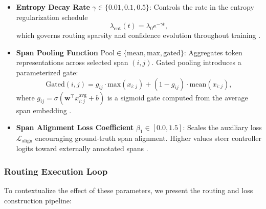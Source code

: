 \begin{itemize}[leftmargin=1.5em]
  \item \textbf{Entropy Decay Rate} \(\gamma \in \{0.01, 0.1, 0.5\}\): Controls the rate in the entropy regularization schedule
  \begin{equation}
  \lambda_{\mathrm{ent}}(t) = \lambda_0 e^{-\gamma t},
  \label{eq:entropy_schedule}
  \end{equation}
  which governs routing sparsity and confidence evolution throughout training \cite{grandvalet2006entropy, pereyra2017regularizing}.

  \item \textbf{Span Pooling Function} \(\mathrm{Pool} \in \{\mathrm{mean}, \mathrm{max}, \mathrm{gated}\}\): Aggregates token representations across selected span \((i, j)\). Gated pooling introduces a parameterized gate:
  \begin{equation}
  \text{Gated}(i, j) = g_{ij} \cdot \mathrm{max}(x_{i:j}) + (1 - g_{ij}) \cdot \mathrm{mean}(x_{i:j}),
  \label{eq:gated_pooling}
  \end{equation}
  where \(g_{ij} = \sigma(\mathbf{w}^\top x_{i:j}^{\text{avg}} + b)\) is a sigmoid gate computed from the average span embedding \cite{kim2019unsupervised, zilliz2023pooling}.

  \item \textbf{Span Alignment Loss Coefficient} \(\beta_1 \in [0.0, 1.5]\): Scales the auxiliary loss \(\mathcal{L}_{\text{align}}\) encouraging ground-truth span alignment. Higher values steer controller logits toward externally annotated spans \cite{liu2024structured}.
\end{itemize}

\subsubsection*{Routing Execution Loop}

To contextualize the effect of these parameters, we present the routing and loss construction pipeline:

